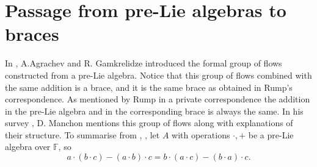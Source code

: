 \documentclass[12pt]{article}
\begin{document}
\section{Passage from pre-Lie algebras to braces}\label{mi}

In \cite{AG}, A.Agrachev and R. Gamkrelidze introduced the formal group of flows constructed from a pre-Lie algebra. Notice that this group of flows combined with the same addition is a brace, and it is the same brace as obtained in Rump's correspondence. As mentioned by Rump in a private correspondence the addition in the pre-Lie algebra and in the corresponding brace is always the same. In his survey \cite{M},  D. Manchon mentions this group of flows along with explanations of their structure. To summarise  from \cite{AG}, \cite{M}, let $A$ with operations $\cdot, +$ be a pre-Lie algebra over $\mathbb F$, so
\[a\cdot (b\cdot c)-(a\cdot b)\cdot c=b\cdot (a\cdot c)-(b\cdot a)\cdot c.\]
\end{document}
